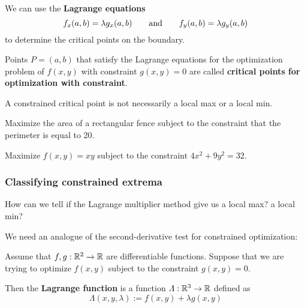     \begin{corollary}
    We can use the \textbf{Lagrange equations} 
    $$f_x(a,b) = \lambda g_x(a,b) \qquad \textnormal{and} \qquad f_y(a,b) = \lambda g_y(a,b)$$
    to determine the critical points on the boundary.
    \end{corollary}
    
    \begin{definition}
    Points $P = (a,b)$ that satisfy the Lagrange equations for the optimization problem of $f(x,y)$ with constraint $g(x,y) = 0$ are called \textbf{critical points for optimization with constraint}.
    \end{definition}

    \begin{remark}
    A constrained critical point is not necessarily a local max or a local min.
    \end{remark}

    \begin{example}
    Maximize the area of a rectangular fence subject to the constraint that the perimeter is equal to 20.
    \end{example}

    \begin{example}
    Maximize $f(x,y) = xy$ subject to the constraint $4x^2 + 9y^2 = 32$.    
    \end{example}

    \subsubsection{Classifying constrained extrema}

    \begin{motivating}
    How can we tell if the Lagrange multiplier method give us a local max? a local min?    
    \end{motivating}


    We need an analogue of the second-derivative test for constrained optimization:

    \begin{definition}
    Assume that $f, g : \mathbb{R}^2 \to \mathbb{R}$ are differentiable functions.  Suppose that we are trying to optimize $f(x,y)$ subject to the constraint $g(x,y) = 0$.

    Then the \textbf{Lagrange function} is a function $\Lambda : \mathbb{R}^3 \to \mathbb{R}$ defined as 
    $$\Lambda(x, y, \lambda) := f(x,y) + \lambda g(x,y)$$
    
    \end{definition}

